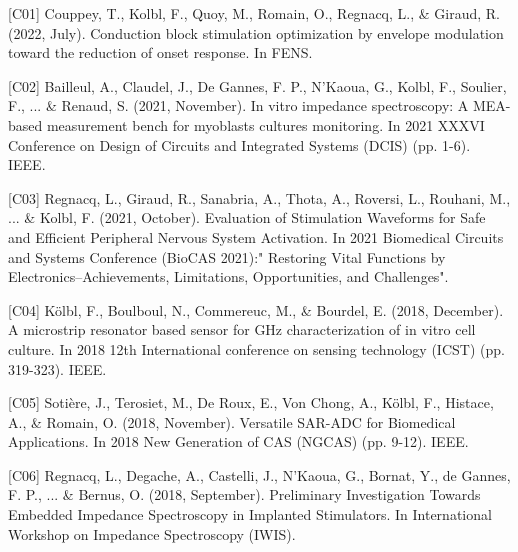 \begin{cvskills}
  \cvskill
    {[C01]} %
    {Couppey, T., Kolbl, F., Quoy, M., Romain, O., Regnacq, L., \& Giraud, R. (2022, July). Conduction block stimulation optimization by envelope modulation toward the reduction of onset response. In FENS.} %
\end{cvskills}  
\begin{cvskills}
  \cvskill
    {[C02]} %
    {Bailleul, A., Claudel, J., De Gannes, F. P., N'Kaoua, G., Kolbl, F., Soulier, F., ... \& Renaud, S. (2021, November). In vitro impedance spectroscopy: A MEA-based measurement bench for myoblasts cultures monitoring. In 2021 XXXVI Conference on Design of Circuits and Integrated Systems (DCIS) (pp. 1-6). IEEE.} %
\end{cvskills}  
\begin{cvskills}    
  \cvskill
    {[C03]} %
    {Regnacq, L., Giraud, R., Sanabria, A., Thota, A., Roversi, L., Rouhani, M., ... \& Kolbl, F. (2021, October). Evaluation of Stimulation Waveforms for Safe and Efficient Peripheral Nervous System Activation. In 2021 Biomedical Circuits and Systems Conference (BioCAS 2021):" Restoring Vital Functions by Electronics–Achievements, Limitations, Opportunities, and Challenges".} %
\end{cvskills}  
\begin{cvskills}    
  \cvskill
    {[C04]} %
    {Kölbl, F., Boulboul, N., Commereuc, M., \& Bourdel, E. (2018, December). A microstrip resonator based sensor for GHz characterization of in vitro cell culture. In 2018 12th International conference on sensing technology (ICST) (pp. 319-323). IEEE.} %
\end{cvskills}  
\begin{cvskills}    
  \cvskill
    {[C05]} %
    {Sotière, J., Terosiet, M., De Roux, E., Von Chong, A., Kölbl, F., Histace, A., \& Romain, O. (2018, November). Versatile SAR-ADC for Biomedical Applications. In 2018 New Generation of CAS (NGCAS) (pp. 9-12). IEEE.} %
\end{cvskills}  
\begin{cvskills}    
  \cvskill
    {[C06]} %
    {Regnacq, L., Degache, A., Castelli, J., N'Kaoua, G., Bornat, Y., de Gannes, F. P., ... \& Bernus, O. (2018, September). Preliminary Investigation Towards Embedded Impedance Spectroscopy in Implanted Stimulators. In International Workshop on Impedance Spectroscopy (IWIS).} %
\end{cvskills}  
